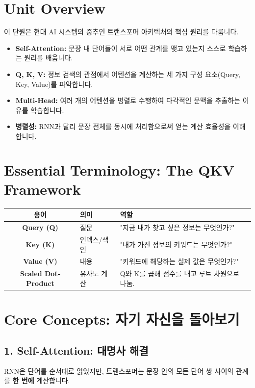 \documentclass[11pt,a4paper]{book}
\theoremstyle{definition}
\begin{document}
\section{Unit Overview}
\begin{summarybox}[title={핵심 목표}]
이 단원은 현대 AI 시스템의 중추인 트랜스포머 아키텍처의 핵심 원리를 다룹니다.
\begin{itemize}
    \item \textbf{Self-Attention:} 문장 내 단어들이 서로 어떤 관계를 맺고 있는지 스스로 학습하는 원리를 배웁니다.
    \item \textbf{Q, K, V:} 정보 검색의 관점에서 어텐션을 계산하는 세 가지 구성 요소(Query, Key, Value)를 파악합니다.
    \item \textbf{Multi-Head:} 여러 개의 어텐션을 병렬로 수행하여 다각적인 문맥을 추출하는 이유를 학습합니다.
    \item \textbf{병렬성:} RNN과 달리 문장 전체를 동시에 처리함으로써 얻는 계산 효율성을 이해합니다.
\end{itemize}
\end{summarybox}

\section{Essential Terminology: The QKV Framework}
\begin{center}
\begin{tabular}{|c|l|l|}
\hline
\textbf{용어} & \textbf{의미} & \textbf{역할} \\ \hline
\textbf{Query (Q)} & 질문 & "지금 내가 찾고 싶은 정보는 무엇인가?" \\ \hline
\textbf{Key (K)} & 인덱스/색인 & "내가 가진 정보의 키워드는 무엇인가?" \\ \hline
\textbf{Value (V)} & 내용 & "키워드에 해당하는 실제 값은 무엇인가?" \\ \hline
\textbf{Scaled Dot-Product} & 유사도 계산 & Q와 K를 곱해 점수를 내고 루트 차원으로 나눔. \\ \hline
\end{tabular}
\end{center}

\section{Core Concepts: 자기 자신을 돌아보기}

\subsection{1. Self-Attention: 대명사 해결}
RNN은 단어를 순서대로 읽었지만, 트랜스포머는 문장 안의 모든 단어 쌍 사이의 관계를 \textbf{한 번에} 계산합니다.
\end{document}
